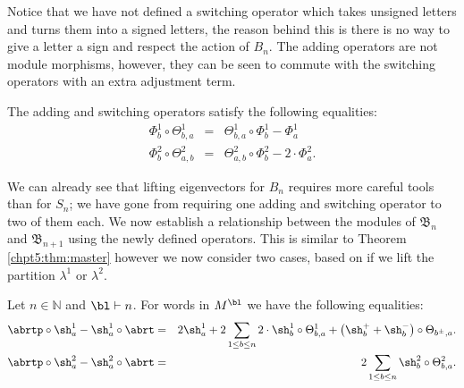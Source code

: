 \documentclass[11pt]{report}
\begin{document}
Notice that we have not defined a switching operator which takes unsigned letters and turns them into a signed letters, the reason behind this is there is no way to give a letter a sign and respect the action of $B_{n}$. The adding operators are not module morphisms, however, they can be seen to commute with the switching operators with an extra adjustment term.

\begin{lemma}
	\label{chpt6:lem:addswitchrelation}
	The adding and switching operators satisfy the following equalities:
	\begin{eqnarray}
	\Phi_{b}^{1} \circ \Theta_{b,a}^{1} & = &\Theta_{b,a}^{1} \circ \Phi_{b}^{1} - \Phi_{a}^{1} \label{chpt6:eqn:addshufflerelation1}\\
	\Phi_{b}^{2} \circ \Theta_{a, b}^{2} & = & \Theta_{a,b}^{2} \circ \Phi_{b}^{2} - 2\cdot \Phi_{a}^{2} \label{chpt6:eqn:addshufflerelation2}.
	\end{eqnarray}
\end{lemma}








We can already see that lifting eigenvectors for $B_{n}$ requires more careful tools than for $S_{n}$; we have gone from requiring one adding and switching operator to two of them each. We now establish a relationship between the modules of $\mathfrak{B}_{n}$ and $\mathfrak{B}_{n+1}$ using the newly defined operators. This is similar to Theorem \ref{chpt5:thm:master} however we now consider two cases, based on if we lift the partition $\lambda^{1}$ or $\lambda^{2}$.

\begin{thm}
	\label{chpt6:thm:master1}
	Let $n\in \mathbb{N}$ and $\bl \vdash n$. For words in $M^{\bl}$ we have the following equalities: 
	\begin{eqnarray}
	\abrtp \circ \sh_{a}^{1} - \sh_{a}^{1} \circ 
	\abrt & = & 2\sh_{a}^{1} +  
	2\sum_{1 \leq b \leq n} 
	2 \cdot \sh_{b}^{1}\circ\Theta_{b,a}^{1} + \left(\sh_{b}^{+} + \sh_{b}^{-}\right) 
	\circ\Theta_{b^{\pm},a}.\label{chpt6:eqn:master1} \\
	\abrtp \circ \sh_{a}^{2} - \sh_{a}^{2} \circ 
	\abrt & = & 2 \sum_{1 \leq b \leq n} 
	\sh_{b}^{2}\circ\Theta_{b,a}^{2}. \label{chpt6:eqn:master2}
	\end{eqnarray}

\end{thm}
\end{document}
